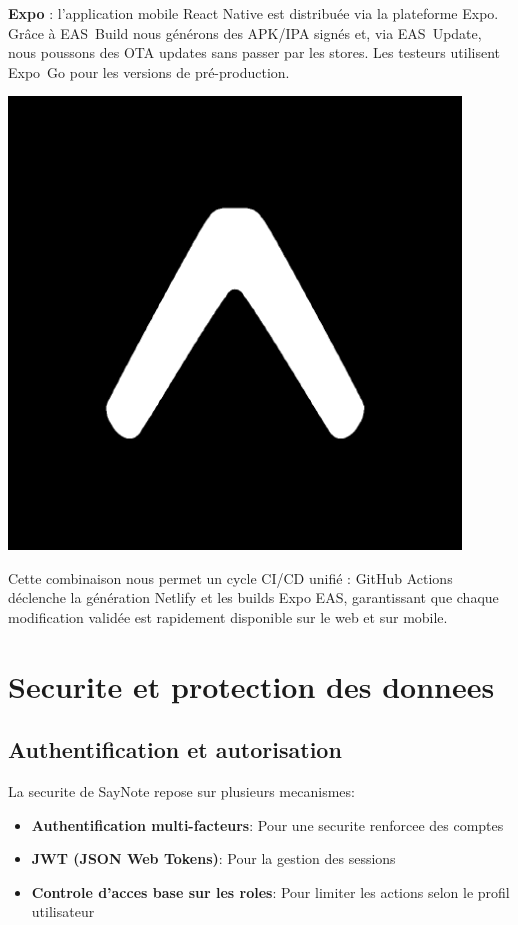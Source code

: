 \begin{minipage}{0.7\textwidth}
\textbf{Expo} : l’application mobile React Native est distribuée via la plateforme Expo. Grâce à EAS~Build nous générons des APK/IPA signés et, via EAS~Update, nous poussons des OTA updates sans passer par les stores. Les testeurs utilisent Expo~Go pour les versions de pré-production.
\end{minipage}%
\hfill
\begin{minipage}{0.25\textwidth}
\centering
\includegraphics[width=0.9\textwidth]{assets/docs/logo_expo.png}
\end{minipage}

Cette combinaison nous permet un cycle CI/CD unifié : GitHub Actions déclenche la génération Netlify et les builds Expo EAS, garantissant que chaque modification validée est rapidement disponible sur le web et sur mobile.

\section{Securite et protection des donnees}
\subsection{Authentification et autorisation}
La securite de SayNote repose sur plusieurs mecanismes:
\begin{itemize}
    \item \textbf{Authentification multi-facteurs}: Pour une securite renforcee des comptes
    \item \textbf{JWT (JSON Web Tokens)}: Pour la gestion des sessions
    \item \textbf{Controle d'acces base sur les roles}: Pour limiter les actions selon le profil utilisateur
\end{itemize}

